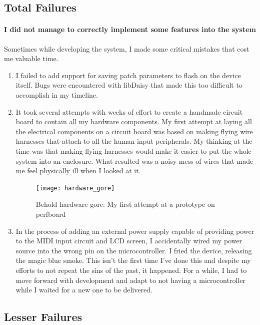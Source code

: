 \documentclass[acmlarge,screen]{acmart}
\begin{document}
	\subsection{Total Failures}
	\paragraph{I did not manage to correctly implement some features into the system} Sometimes while developing the system, I made some critical mistakes that cost me valuable time.
	\begin{enumerate}
		\item I failed to add support for saving patch parameters to flash on the device itself. Bugs were encountered with libDaisy that made this too difficult to accomplish in my timeline.
		\item It took several attempts with weeks of effort to create a handmade circuit board to contain all my hardware components. My first attempt at laying all the electrical components on a circuit board was based on making flying wire harnesses that attach to all the human input peripherals. My thinking at the time was that making flying harnesses would make it easier to put the whole system into an enclosure. What resulted was a noisy mess of wires that made me feel physically ill when I looked at it.
		\begin{figure}[H]
			\texttt{[image: hardware\_gore]}
			\caption{Behold hardware gore: My first attempt at a prototype on perfboard}
			\centering
		\end{figure}
		\item In the process of adding an external power supply capable of providing power to the MIDI input circuit and LCD screen, I accidentally wired my power source into the wrong pin on the microcontroller. I fried the device, releasing the magic blue smoke. This isn't the first time I've done this and despite my efforts to not repeat the sins of the past, it happened. For a while, I had to move forward with development and adapt to not having a microcontroller while I waited for a new one to be delivered.
	\end{enumerate} 
	
	\subsection{Lesser Failures}
\end{document}
